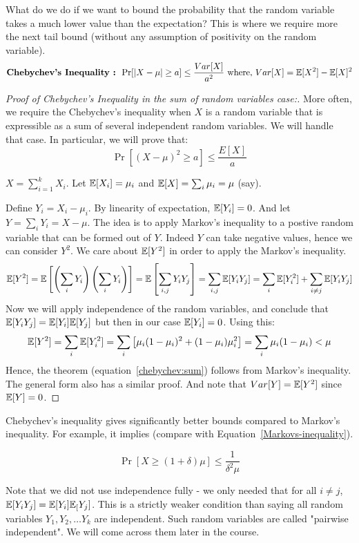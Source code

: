 \begin{description}
What do we do if we want to bound the probability that the random variable takes a much lower value than the expectation? This is where we require more the next tail bound (without any assumption of positivity on the random variable).
$$\textrm{\bf Chebychev's Inequality : } \Pr[|X-\mu| \ge a] \le \frac{Var[X]}{a^2} \textrm{ where, $Var[X] = {\mathbb E}[X^2] - {\mathbb E}[X]^2$} $$
\begin{proof}[\textit{Proof of Chebychev's Inequality in the sum of random variables case:}]
More often, we require the Chebychev's inequality when $X$ is a random variable that is expressible as a sum of several independent random variables. We will handle that case. In particular, we will prove that:
\begin{equation}
\Pr\left[ (X-\mu)^2 \ge a \right] \le \frac{E[X]}{a}
\label{chebychev:sum}
\end{equation}

$X = \sum_{i=1}^k X_i$. Let ${\mathbb E}[X_i] = \mu_i$ and ${\mathbb E}[X] = \sum_i \mu_i = \mu$ (say). 

Define $Y_i = X_i - \mu_i$. By linearity of expectation, ${\mathbb E}[Y_i] = 0$. And let $Y = \sum_i Y_i = X - \mu$. The idea is to apply Markov's inequality to a postive random variable that can be formed out of $Y$. Indeed $Y$ can take negative values, hence we can consider $Y^2$. We care about ${\mathbb E}[Y^2]$ in order to apply the Markov's inequality. 
$${\mathbb E}[Y^2] = {\mathbb E}\left[\left( \sum_i Y_i \right) \left( \sum_i Y_i \right)\right] =  {\mathbb E} \left[\sum_{i,j} Y_i Y_j \right] = \sum_{i,j} {\mathbb E}[Y_iY_j] = \sum_i {\mathbb E}[Y_i^2] + \sum_{i \neq j} {\mathbb E}[Y_iY_j] $$
Now we will apply independence of the random variables, and conclude that ${\mathbb E}[Y_iY_j] = {\mathbb E}[Y_i]{\mathbb E}[Y_j]$ but then in our case ${\mathbb E}[Y_i]=0$. Using this:
$${\mathbb E}[Y^2] = \sum_i {\mathbb E}[Y_i^2] = \sum_i \left[ \mu_i(1-\mu_i)^2 + (1-\mu_i)\mu_i^2 \right] = \sum_i \mu_i(1-\mu_i) < \mu$$
Hence, the theorem (equation~\ref{chebychev:sum}) follows from Markov's inequality.
The general form also has a similar proof. And note that $Var[Y] = {\mathbb E}[Y^2]$ since ${\mathbb E}[Y] = 0$.
\end{proof}

Chebychev's inequality gives significantly better bounds compared to Markov's inequality. For example, it implies (compare with Equation~\ref{Markovs-inequality}).

\begin{equation}
\Pr[X \ge (1 + \delta)\mu] \le \frac{1}{\delta^2 \mu}
\label{Chebychev-inequality}
\end{equation}

\begin{remark}
Note that we did not use independence fully - we only needed that for all $i \ne j$, ${\mathbb E}[Y_iY_j] = {\mathbb E}[Y_i]{\mathbb E}_[Y_j]$. This is a strictly weaker condition than saying all random variables $Y_1, Y_2, \ldots Y_k$ are independent. Such random variables are called "pairwise independent". We will come across them later in the course.
\end{remark}


\end{description}

